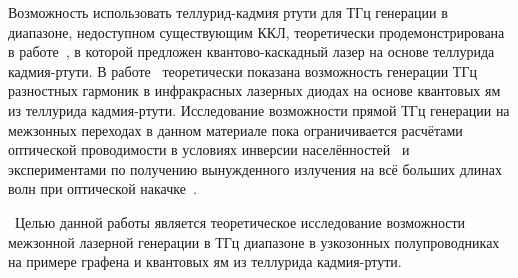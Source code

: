 Возможность использовать теллурид-кадмия ртути для ТГц генерации в диапазоне, недоступном существующим ККЛ, теоретически продемонстрирована в работе~\cite{HgCdTe_QCL}, в которой предложен квантово-каскадный лазер на основе теллурида кадмия-ртути. В работе~\cite{HgCdTe_QW_THz_DFG} теоретически показана возможность генерации ТГц разностных гармоник в инфракрасных лазерных диодах на основе квантовых ям из теллурида кадмия-ртути. Исследование возможности прямой ТГц генерации на межзонных переходах в данном материале пока ограничивается расчётами оптической проводимости в условиях инверсии населённостей~\cite{HgCdTe_THz_gain} и экспериментами по получению вынужденного излучения на всё больших длинах волн при оптической накачке~\cite{HgCdTe-not-so-long-wavelength_emission, HgCdTe-stimulated_emission}.

\aimsandtasks\ 
Целью данной работы является теоретическое исследование возможности межзонной лазерной генерации в ТГц диапазоне в узкозонных полупроводниках на примере графена и квантовых ям из теллурида кадмия-ртути.

